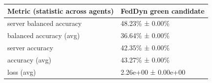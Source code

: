 \begin{tabular}{ll}
\hline
 Metric (statistic across agents)   & FedDyn green candidate   \\
\hline
 server balanced accuracy           & 48.23\% ± 0.00\%           \\
 balanced accuracy (avg)            & 36.64\% ± 0.00\%           \\
 server accuracy                    & 42.35\% ± 0.00\%           \\
 accuracy (avg)                     & 43.27\% ± 0.00\%           \\
 loss (avg)                         & 2.26e+00 ± 0.00e+00      \\
\hline
\end{tabular}